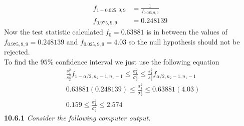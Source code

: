 \documentclass[11pt]{article}
\begin{document}
\begin{equation}
\begin{split}
f_{1-0.025, 9, 9} &= \frac{1}{f_{0.025, 9, 9}}\\
f_{0.975, 9, 9}&=0.248139
\end{split}
\end{equation}
Now the test statistic calculated $f_0 = 0.63881$ is in between the values of$ f_{0.975, 9, 9}=0.248139$ and $f_{0.025, 9, 9} = 4.03$ so the null hypothesis should not be rejected. \\To find the $95\%$ confidence interval we just use the following equation
\begin{equation}
\begin{split}
&\frac{s_1^2}{s_2^2}f_{1-\alpha/2, n_2-1, n_1-1} \leq \frac{\sigma_1^2}{\sigma_2^2} \leq \frac{s_1^2}{s_2^2}f_{\alpha/2, n_2-1, n_1-1} \\
&0.63881(0.248139)  \leq \frac{\sigma_1^2}{\sigma_2^2} \leq  0.63881(4.03)\\
&0.159 \leq\frac{\sigma_1^2}{\sigma_2^2} \leq2.574
\end{split}
\end{equation}
\noindent \textbf{10.6.1} \emph{Consider the following computer output.}
\end{document}
